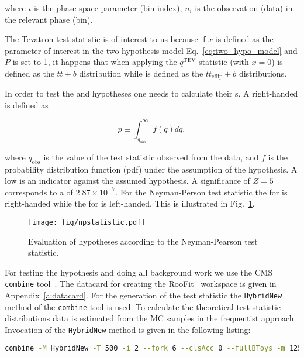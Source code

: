 \noindent where $i$ is the phase-space parameter (bin index), $n_{i}$ is the observation (data) in the relevant phase (bin).

The Tevatron test statistic is of interest to us because if $x$ is defined as the parameter of interest in the two hypothesis model Eq.~\ref{eq:two_hypo_model} and $P$ is set to 1, it happens that when applying the $q^{\text{TEV}}$ statistic \Hnull (with $x=0$) is defined as the $t\overline{t} + b$ distribution while \Halt is defined as the $t\overline{t}_{\text{cflip}} + b$ distributions.

In order to test the \Hnull and \Halt hypotheses one needs to calculate their \pval s. A right-handed \pval is defined as

\begin{equation}
p\equiv\int_{q_{obs}}^{\infty}f(q)dq,
\end{equation}
    
\noindent where $q_{\text{obs}}$ is the value of the test statistic observed from the data, and $f$ is the probability distribution function (pdf) under the assumption of the hypothesis. A low \pval is an indicator against the assumed hypothesis. A significance of $Z=5$ corresponds to a \pval of $2.87\times10^{-7}$. For the Neyman-Person test statistic the \pval for \Hnull is right-handed while the \pval for \Halt is left-handed. This is illustrated in Fig.~\ref{fig:npstatistic}.

\begin{figure}
  \centering
  \texttt{[image: fig/npstatistic.pdf]}
  \caption{Evaluation of hypotheses according to the Neyman-Pearson test statistic.}
  \label{fig:npstatistic}
\end{figure}

For testing the hypothesis and doing all background work we use the CMS \lstinline[language=sh]|combine| tool~\cite{url:combine}. The datacard for creating the RooFit~\cite{url:roofit} workspace is given in Appendix~\ref{a:datacard}. For the generation of the test statistic the \lstinline[language=sh]|HybridNew| method of the \lstinline[language=sh]|combine| tool is used. To calculate the theoretical test statistic distributions data is estimated from the MC samples in the frequentist approach. Invocation of the \lstinline[language=sh]|HybridNew| method is given in the following listing:

\begin{lstlisting}[language=sh, breaklines=true]
  combine -M HybridNew -T 500 -i 2 --fork 6 --clsAcc 0 --fullBToys -m 125.7 TwoHypo.root --seed 8192 --testStat=TEV  --saveHybridResult --singlePoint 1
\end{lstlisting}

